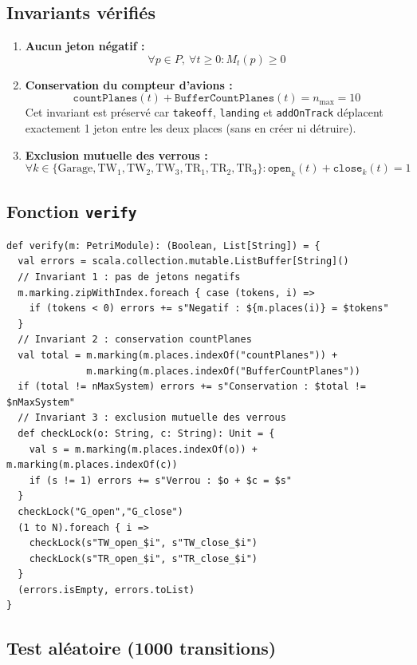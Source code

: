 \documentclass[a4paper,12pt]{article}
\begin{document}
\subsection{Invariants vérifiés}

\begin{enumerate}
  \item \textbf{Aucun jeton négatif :}
  \[\forall p \in P,\ \forall t \geq 0 : M_t(p) \geq 0\]

  \item \textbf{Conservation du compteur d'avions :}
  \[\texttt{countPlanes}(t) + \texttt{BufferCountPlanes}(t) = n_{\max} = 10\]
  Cet invariant est préservé car \texttt{takeoff}, \texttt{landing} et
  \texttt{addOnTrack} déplacent exactement 1 jeton entre les deux places
  (sans en créer ni détruire).

  \item \textbf{Exclusion mutuelle des verrous :}
  \[\forall k \in \{\text{Garage}, \text{TW}_1, \text{TW}_2, \text{TW}_3,
    \text{TR}_1, \text{TR}_2, \text{TR}_3\} :
    \texttt{open}_k(t) + \texttt{close}_k(t) = 1\]
\end{enumerate}

\subsection{Fonction \texttt{verify}}

\begin{lstlisting}
def verify(m: PetriModule): (Boolean, List[String]) = {
  val errors = scala.collection.mutable.ListBuffer[String]()
  // Invariant 1 : pas de jetons negatifs
  m.marking.zipWithIndex.foreach { case (tokens, i) =>
    if (tokens < 0) errors += s"Negatif : ${m.places(i)} = $tokens"
  }
  // Invariant 2 : conservation countPlanes
  val total = m.marking(m.places.indexOf("countPlanes")) +
              m.marking(m.places.indexOf("BufferCountPlanes"))
  if (total != nMaxSystem) errors += s"Conservation : $total != $nMaxSystem"
  // Invariant 3 : exclusion mutuelle des verrous
  def checkLock(o: String, c: String): Unit = {
    val s = m.marking(m.places.indexOf(o)) + m.marking(m.places.indexOf(c))
    if (s != 1) errors += s"Verrou : $o + $c = $s"
  }
  checkLock("G_open","G_close")
  (1 to N).foreach { i =>
    checkLock(s"TW_open_$i", s"TW_close_$i")
    checkLock(s"TR_open_$i", s"TR_close_$i")
  }
  (errors.isEmpty, errors.toList)
}
\end{lstlisting}

\subsection{Test aléatoire (1000 transitions)}
\end{document}
